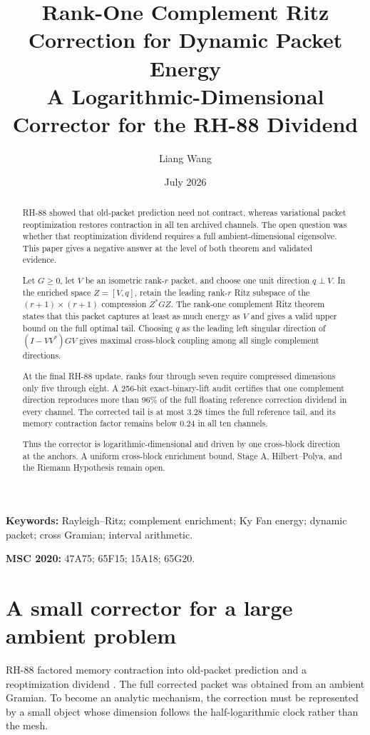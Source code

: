 \documentclass[11pt]{article}
\title{Rank-One Complement Ritz Correction for Dynamic Packet Energy\\
\large A Logarithmic-Dimensional Corrector for the RH-88 Dividend}
\author{Liang Wang}
\date{July 2026}
\theoremstyle{remark}
\begin{document}
\maketitle

\begin{abstract}
RH-88 showed that old-packet prediction need not contract, whereas variational
packet reoptimization restores contraction in all ten archived channels.  The
open question was whether that reoptimization dividend requires a full
ambient-dimensional eigensolve.  This paper gives a negative answer at the
level of both theorem and validated evidence.

Let $G\ge0$, let $V$ be an isometric rank-$r$ packet, and choose one unit
direction $q\perp V$.  In the enriched space $Z=[V,q]$, retain the leading
rank-$r$ Ritz subspace of the $(r+1)\times(r+1)$ compression $Z^*GZ$.  The
rank-one complement Ritz theorem states that this packet captures at least as
much energy as $V$ and gives a valid upper bound on the full optimal tail.
Choosing $q$ as the leading left singular direction of
$(I-VV^*)GV$ gives maximal cross-block coupling among all single complement
directions.

At the final RH-88 update, ranks four through seven require compressed
dimensions only five through eight.  A 256-bit exact-binary-lift audit
certifies that one complement direction reproduces more than $96\%$ of the
full floating reference correction dividend in every channel.  The corrected
tail is at most $3.28$ times the full reference tail, and its memory
contraction factor remains below $0.24$ in all ten channels.

Thus the corrector is logarithmic-dimensional and driven by one cross-block
direction at the anchors.  A uniform cross-block enrichment bound, Stage A,
Hilbert--Polya, and the Riemann Hypothesis remain open.
\end{abstract}

\noindent\textbf{Keywords:} Rayleigh--Ritz; complement enrichment; Ky Fan
energy; dynamic packet; cross Gramian; interval arithmetic.

\medskip
\noindent\textbf{MSC 2020:} 47A75; 65F15; 15A18; 65G20.

\section{A small corrector for a large ambient problem}

RH-88 factored memory contraction into old-packet prediction and a
reoptimization dividend \citep{WangPredictor2026}.  The full corrected packet
was obtained from an ambient Gramian.  To become an analytic mechanism, the
correction must be represented by a small object whose dimension follows the
half-logarithmic clock rather than the mesh.
\end{document}
